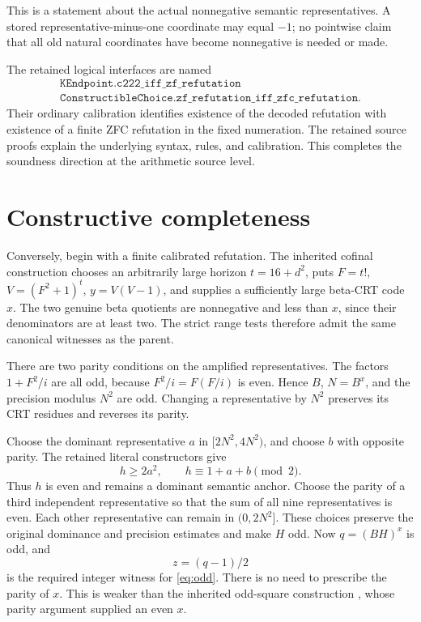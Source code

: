 This is a statement about the actual nonnegative semantic
representatives. A stored representative-minus-one coordinate may
equal \(-1\); no pointwise claim that all old natural coordinates have
become nonnegative is needed or made.

The retained logical interfaces are named
\[
 \begin{gathered}
 \texttt{KEndpoint.c222\_iff\_zf\_refutation}
 \\
 \texttt{ConstructibleChoice.zf\_refutation\_iff\_zfc\_refutation}.
 \end{gathered}
\]
Their ordinary calibration identifies existence of the decoded
refutation with existence of a finite ZFC refutation in the fixed
numeration. The retained source proofs explain the underlying syntax,
rules, and calibration. This completes the soundness direction at the
arithmetic source level.

\section{Constructive completeness}

Conversely, begin with a finite calibrated refutation. The inherited
cofinal construction chooses an arbitrarily large horizon
\(t=16+d^2\), puts \(F=t!\), \(V=(F^2+1)^t\),
\(y=V(V-1)\), and supplies a sufficiently large beta-CRT code \(x\).
The two genuine beta quotients are nonnegative and less than \(x\),
since their denominators are at least two. The strict range tests
therefore admit the same canonical witnesses as the parent.

There are two parity conditions on the amplified representatives.
The factors \(1+F^2/i\) are all odd, because
\(F^2/i=F(F/i)\) is even. Hence \(B\), \(N=B^x\), and
the precision modulus \(N^2\) are odd. Changing a representative
by \(N^2\) preserves its CRT residues and reverses its parity.

Choose the dominant representative \(a\) in
\([2N^2,4N^2)\), and choose \(b\) with opposite parity.
The retained literal constructors give
\[
 h\ge2a^2,\qquad h\equiv1+a+b\pmod2.
\]
Thus \(h\) is even and remains a dominant semantic anchor.
Choose the parity of a third independent representative so that the
sum of all nine representatives is even. Each other representative
can remain in \((0,2N^2]\). These choices preserve the original
dominance and precision estimates and make \(H\) odd.
Now \(q=(BH)^x\) is odd, and
\[
 z=(q-1)/2
\]
is the required integer witness for \eqref{eq:odd}.
There is no need to prescribe the parity of \(x\).
This is weaker than the inherited odd-square construction
\cite{centered}, whose parity argument supplied an even \(x\).

